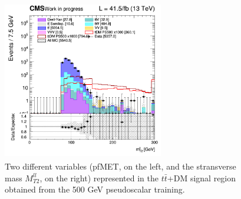 \documentclass[a4paper, 10pt, openright]{report}
\begin{document}
\begin{figure}[htbp]
{\begin{minipage}[b]{.48\textwidth}
\end{minipage}\hfill
\begin{minipage}[b]{.48\textwidth}
\includegraphics[width=7cm, height=7cm]{figs/2017/SmearSR-ttDM-pseudo500/log_cratio_TTbar_topCR_ll_BDT_ttDM500_mt2ll.png}
\end{minipage} \hfill
}
\caption{Two different variables (pf\ac{MET}, on the left, and the stransverse mass $M_{T2}^{ll}$, on the right) represented in the $t \bar t$+DM signal region obtained from the 500 GeV pseudoscalar training.}
\label{fig:SR8}
\end{figure}
\end{document}
